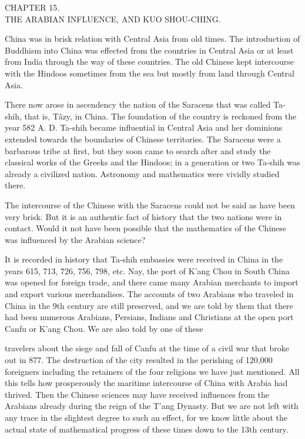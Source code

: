 \documentclass[11pt]{article}
\newcommand{\scanpage}[2]{\clearpage\setcounter{footnote}{0}\noindent{\footnotesize\color{gray}PDF page #1 · #2}\par\medskip}
\newcommand{\scanfooter}{}
\begin{document}
\begin{center}
CHAPTER 15.\\
THE ARABIAN INFLUENCE, AND KUO SHOU-CHING.
\end{center}

China was in brisk relation with Central Asia from old times. The introduction of Buddhism into China was effected from the countries in Central Asia or at least from India through the way of these countries. The old Chinese kept intercourse with the Hindoos sometimes from the sea but mostly from land through Central Asia.

There now arose in ascendency the nation of the Saracens that was called Ta-shih, that is, Tâzy, in China. The foundation of the country is reckoned from the year 582 A. D. Ta-shih became influential in Central Asia and her dominions extended towards the boundaries of Chinese territories. The Saracens were a barbarous tribe at first, but they soon came to search after and study the classical works of the Greeks and the Hindoos; in a generation or two Ta-shih was already a civilized nation. Astronomy and mathematics were vividly studied there.

The intercourse of the Chinese with the Saracens could not be said as have been very brisk. But it is an authentic fact of history that the two nations were in contact. Would it not have been possible that the mathematics of the Chinese was influenced by the Arabian science?

It is recorded in history that Ta-shih embassies were received in China in the years 615, 713, 726, 756, 798, etc. Nay, the port of K'ang Chou in South China was opened for foreign trade, and there came many Arabian merchants to import and export various merchandises. The accounts of two Arabians who traveled in China in the 9th century are still preserved, and we are told by them that there had been numerous Arabians, Persians, Indians and Christians at the open port Canfu or K'ang Chou. We are also told by one of these
\scanfooter

\scanpage{0113}{Chapter 15, printed page 99}
travelers about the siege and fall of Canfu at the time of a civil war that broke out in 877. The destruction of the city resulted in the perishing of 120,000 foreigners including the retainers of the four religions we have just mentioned. All this tells how prosperously the maritime intercourse of China with Arabia had thrived. Then the Chinese sciences may have received influences from the Arabians already during the reign of the T'ang Dynasty. But we are not left with any trace in the slightest degree to such an effect, for we know little about the actual state of mathematical progress of these times down to the 13th century.
\end{document}
